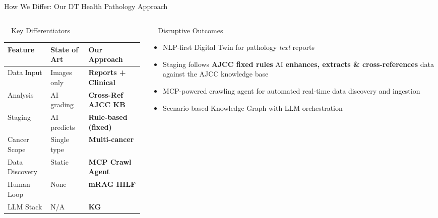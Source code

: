 \documentclass[aspectratio=169, 10pt]{beamer}
\begin{document}
\begin{frame}{How We Differ: Our DT Health Pathology Approach}

\begin{columns}[T]
\begin{column}{0.48\textwidth}

\begin{block}{\faList\ \ Key Differentiators}
\footnotesize
\begin{tabular}{@{}p{1.8cm}p{1.6cm}p{2.2cm}@{}}
\toprule
\textbf{Feature} & \textbf{State of Art} & \textbf{Our Approach} \\
\midrule
Data Input & Images only & \textcolor{dtgreen}{\textbf{Reports + Clinical}} \\
Analysis & AI grading & \textcolor{dtgreen}{\textbf{Cross-Ref AJCC KB}} \\
Staging & AI predicts & \textcolor{dtgreen}{\textbf{Rule-based (fixed)}} \\
Cancer Scope & Single type & \textcolor{dtgreen}{\textbf{Multi-cancer}} \\
Data Discovery & Static & \textcolor{dtgreen}{\textbf{MCP Crawl Agent}} \\
Human Loop & None & \textcolor{dtgreen}{\textbf{mRAG HILF}} \\
LLM Stack & N/A & \textcolor{dtgreen}{\textbf{KG}} \\
\bottomrule
\end{tabular}
\end{block}

\end{column}

\begin{column}{0.50\textwidth}

\begin{exampleblock}{\faRocket\ \ Disruptive Outcomes}
\footnotesize
\begin{itemize}\setlength{\itemsep}{2pt}
    \item NLP-first Digital Twin for pathology \textit{text} reports
    \item Staging follows \textbf{AJCC fixed rules}  AI \textbf{enhances, extracts \& cross-references} data against the AJCC knowledge base
    \item MCP-powered crawling agent for automated real-time data discovery and ingestion
    \item Scenario-based Knowledge Graph with LLM orchestration
\end{itemize}
\end{exampleblock}


\end{column}
\end{columns}
\end{frame}
\end{document}
